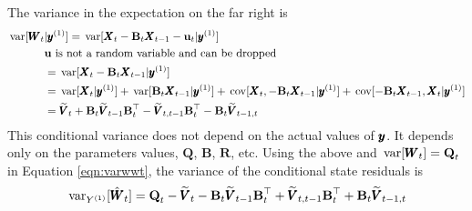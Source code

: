 \documentclass[]{article}
\def\UPS{\mbox{\boldmath $\Upsilon$}}
\def\BB{\mbox{$\mathbf B$}}	\def\bb{\mbox{$\mathbf b$}} \def\Bb{\mbox{$\mathbf J$}} \def\Ba{\mbox{$\mathbf L$}} \def\Bm{\UPS}
\def\QQ{\mbox{$\mathbf Q$}}	 \def\qq{\mbox{$\mathbf q$}} \def\Qb{\mbox{$\mathbf G$}}  \def\Qm{\mathbb{Q}}
\def\RR{\mbox{$\mathbf R$}}	 \def\rr{\mbox{$\mathbf r$}} \def\Rb{\mbox{$\mathbf H$}}	\def\Rm{\mathbb{R}}
\def\VV{\mbox{$\pmb{V}$}}	\def\vv{\mbox{$\pmb{v}$}}
\def\WW{\mbox{$\pmb{W}$}}	\def\ww{\mbox{$\pmb{w}$}}
\def\XX{\mbox{$\pmb{X}$}}	\def\xx{\mbox{$\pmb{x}$}}
\def\var{\,\textup{\textrm{var}}}
\def\cov{\,\textup{\textrm{cov}}}
\def\hatVt{\widetilde{\VV}_t}
\def\hatVtm{\widetilde{\VV}_{t-1}}
\def\hatVttm{\widetilde{\VV}_{t,t-1}}
\begin{document}
The variance in the expectation on the far right is
\begin{equation}
\begin{split}
\var[\WW_t&|\yy^{(1)}] = \var[ \XX_t - \BB_t\XX_{t-1}-\uu_t | \yy^{(1)} ]\\
&\uu\mbox{ is not a random variable and can be dropped}\\
& = \var[ \XX_t - \BB_t\XX_{t-1} | \yy^{(1)} ] \\
& = \var[ \XX_t | \yy^{(1)} ] + \var[\BB_t\XX_{t-1} | \yy^{(1)} ] + \cov[\XX_t, -\BB_t\XX_{t-1} | \yy^{(1)} ] + \cov[ -\BB_t\XX_{t-1}, \XX_t | \yy^{(1)} ]\\
& = \hatVt + \BB_t \hatVtm \BB_t^\top - \hatVttm \BB_t^\top - \BB_t\widetilde{\VV}_{t-1,t}
\end{split}
\end{equation}
This conditional variance does not depend on the actual values of $\mbox{$\pmb{y}$}$.  It depends only on the parameters values, $\QQ$, $\BB$, $\RR$, etc.
Using the above and $\var[\WW_t]=\QQ_t$ in Equation \ref{eqn:varwwt}, the variance of the conditional state residuals is
\begin{equation}
\var_{Y^{(1)}}[\hat{\WW}_t]  =  \QQ_t - \hatVt - \BB_t \hatVtm \BB_t^\top + \hatVttm \BB_t^\top + \BB_t\widetilde{\VV}_{t-1,t}
\end{equation}
\end{document}
